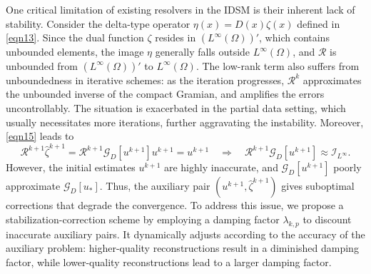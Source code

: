 \documentclass[onefignum,onetabnum]{siamart190516}
\numberwithin{equation}{section}
\begin{document}
One critical limitation of existing resolvers in the IDSM is their inherent lack of stability.
Consider the delta-type operator $\eta(x) = D(x)\zeta(x)$ defined in \eqref{eqn13}.
Since the dual function $\zeta$ resides in $(L^{\infty}(\Omega))'$, which contains unbounded elements, the image $\eta$ generally falls outside $L^{\infty}(\Omega)$, and $\mathcal{R}$ is unbounded from $(L^{\infty}(\Omega))'$ to $L^{\infty}(\Omega)$.
The low-rank term also suffers from unboundedness in iterative schemes: as the iteration progresses, $\mathcal{R}^{k}$ approximates the unbounded inverse of the compact Gramian, and amplifies the errors uncontrollably.
The situation is exacerbated in the partial data setting, which usually necessitates more iterations, further aggravating the instability.
Moreover, \eqref{eqn15} leads to
\begin{equation*}
\mathcal{R}^{k+1}\hat{\zeta}^{k+1} = \mathcal{R}^{k+1}\mathcal{G}_{D}[u^{k+1}]u^{k+1} = u^{k+1} \quad \Rightarrow \quad \mathcal{R}^{k+1}\mathcal{G}_{D}[u^{k+1}] \approx \mathcal{I}_{L^{\infty}}.
\end{equation*}
However, the initial estimates $u^{k+1}$ are highly inaccurate, and $\mathcal{G}_D[u^{k+1}]$ poorly approximate $\mathcal{G}_D[u_{*}]$. Thus, the auxiliary pair $(u^{k+1}, \hat{\zeta}^{k+1})$ gives suboptimal corrections that degrade the convergence.
To address this issue, we propose a stabilization-correction scheme by employing a damping factor $\lambda_{k,p}$ to discount inaccurate auxiliary pairs.
It dynamically adjusts according to the accuracy of the auxiliary problem: higher-quality reconstructions result in a diminished damping factor, while lower-quality reconstructions lead to a larger damping factor.
\end{document}
